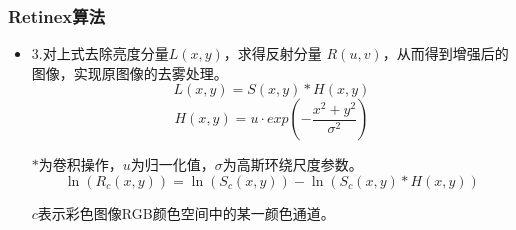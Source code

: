     \begin{frame}
      \frametitle{Retinex算法}
      \begin{itemize}
        \item 3.对上式去除亮度分量$L(x, y)$，求得反射分量 $R(u, v)$，从而得到增强后的图像，实现原图像的去雾处理。
        \begin{equation}
              L(x,y)=S(x,y)*H(x,y)
        \end{equation}
        \begin{equation}
              H(x,y)=u·exp(-\frac{x^2+y^2}{\sigma^2})
        \end{equation}

        $*$为卷积操作，$u$为归一化值，$\sigma$为高斯环绕尺度参数。
        \begin{equation}
           \ln(R_c(x,y))=\ln(S_c(x,y))-\ln(S_c(x,y) * H(x,y))
        \end{equation}

        $c$表示彩色图像RGB颜色空间中的某一颜色通道。

      \end{itemize}
    \end{frame}

